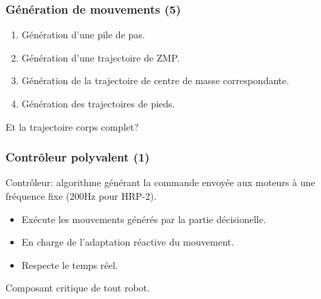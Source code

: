 \documentclass[14pt,utf8x,hyperref={pdfpagelabels=false}]{beamer}
\begin{document}
\begin{slideDecision}
  \frametitle{Génération de mouvements (5)}
  \begin{changeleftmargin}{1.5cm}
  \begin{center}
    \begin{enumerate}
      \item Génération d'une pile de pas.
      \item Génération d'une trajectoire de ZMP.
      \item Génération de la trajectoire de centre de masse
        correspondante.
      \item Génération des trajectoires de pieds.
    \end{enumerate}

    \bigskip

    \alert{Et la trajectoire corps complet?}
  \end{center}
  \end{changeleftmargin}
\end{slideDecision}


\begin{slideAction}
  \frametitle{Contrôleur polyvalent (1)}

  \begin{changeleftmargin}{1.1cm}
  \begin{center}
    Contrôleur: algorithme générant la commande envoyée aux moteurs à
    une fréquence fixe (200Hz pour HRP-2).

    \bigskip

    \begin{itemize}
    \item Exécute les mouvements générés par la partie décisionelle.
    \item En charge de l'adaptation réactive du mouvement.
    \item Respecte le temps réel.
    \end{itemize}

    \bigskip

    Composant \alert{critique} de tout robot.
  \end{center}
  \end{changeleftmargin}
\end{slideAction}
\end{document}
